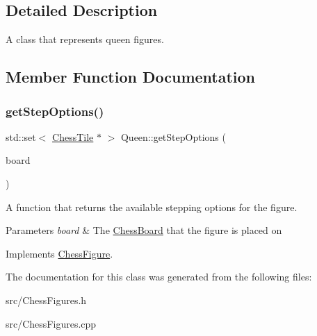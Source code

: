 \subsection{Detailed Description}
A class that represents queen figures. 

\subsection{Member Function Documentation}
\mbox{\label{classQueen_a0fe4b1feaa74c1b2879ce991771054b0}} 
\subsubsection{\texorpdfstring{get\+Step\+Options()}{getStepOptions()}}
{\footnotesize\ttfamily std\+::set$<$ \mbox{\hyperlink{classChessTile}{Chess\+Tile}} $\ast$ $>$ Queen\+::get\+Step\+Options (\begin{DoxyParamCaption}\item[{\mbox{\hyperlink{classChessBoard}{Chess\+Board}} \&}]{board }\end{DoxyParamCaption})\hspace{0.3cm}{\ttfamily [virtual]}}



A function that returns the available stepping options for the figure. 


\begin{DoxyParams}{Parameters}
{\em board} & The \mbox{\hyperlink{classChessBoard}{Chess\+Board}} that the figure is placed on \\
\hline
\end{DoxyParams}


Implements \mbox{\hyperlink{classChessFigure_ae78d52e35c4ea926f492d211c69758bd}{Chess\+Figure}}.



The documentation for this class was generated from the following files\+:\begin{DoxyCompactItemize}
\item 
src/Chess\+Figures.\+h\item 
src/Chess\+Figures.\+cpp\end{DoxyCompactItemize}
